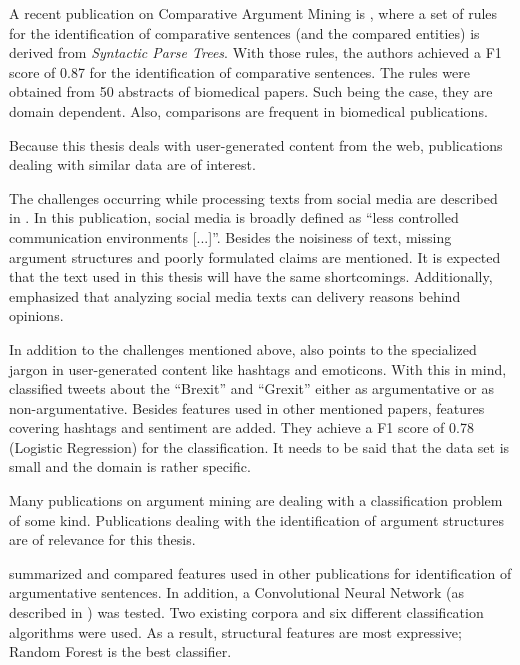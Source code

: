 A recent publication on Comparative Argument Mining is \cite{gupta2017identifying}, where a set of rules for the identification of comparative sentences (and the compared entities) is derived from \emph{Syntactic Parse Trees}. With those rules, the authors achieved a F1 score of 0.87 for the identification of comparative sentences. The rules were obtained from 50 abstracts of biomedical papers. Such being the case, they are domain dependent. Also, comparisons are frequent in biomedical publications.\newline

Because this thesis deals with user-generated content from the web, publications dealing with similar data are of interest.

The challenges occurring while processing texts from social media are described in \cite{Snajder2017Social-Media-Ar}.  In this publication, social media is broadly defined as \enquote{less controlled communication environments [...]}. Besides the noisiness of text, missing argument structures and poorly formulated claims are mentioned. It is expected that the text used in this thesis will have the same shortcomings. Additionally, \cite{Snajder2017Social-Media-Ar} emphasized that analyzing social media texts can delivery reasons behind opinions. 

In addition to the challenges mentioned above, \cite{Dusmanu2017Argument-Mining} also points to the specialized jargon in user-generated content like hashtags and emoticons. With this in mind, \cite{Dusmanu2017Argument-Mining} classified tweets about the \enquote{Brexit} and \enquote{Grexit} either as argumentative or as non-argumentative. Besides features used in other mentioned papers, features covering hashtags and sentiment are added. They achieve a F1 score of 0.78 (Logistic Regression) for the classification. It needs to be said that the data set is small and the domain is rather specific.\newline

Many publications on argument mining are dealing with a classification problem of some kind. Publications dealing with the identification of argument structures are of relevance for this thesis.

\cite{Aker2017What-works-and-} summarized and compared features used in other publications for identification of argumentative sentences. In addition, a Convolutional Neural Network (as described in \cite{Kim2014Convolutional-N}) was tested. Two existing corpora and six different classification algorithms were used. As a result, structural features are most expressive; Random Forest is the best classifier.

